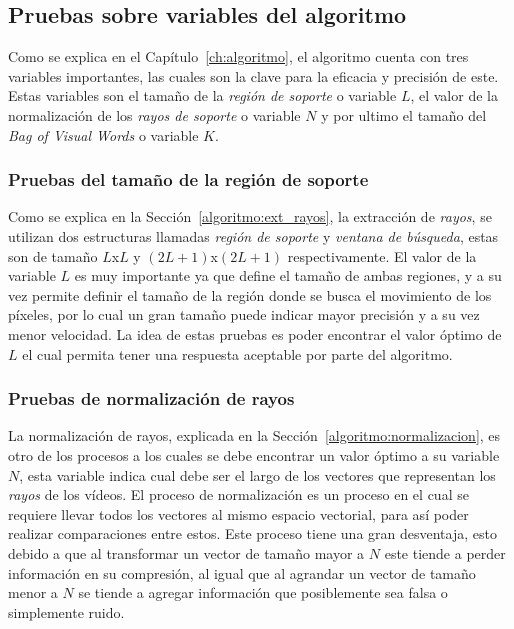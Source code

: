 \subsection{Pruebas sobre variables del algoritmo}
\label{exp:var}
Como se explica en el Capítulo~\ref{ch:algoritmo}, el algoritmo cuenta con tres variables importantes, las cuales son la clave para la eficacia y precisión de este. Estas variables son el tamaño de la \textit{región de soporte} o variable $L$, el valor de la normalización de los \textit{rayos de soporte} o variable $N$ y por ultimo el tamaño del \textit{Bag of Visual Words} o variable $K$.

\subsubsection{Pruebas del tamaño de la región de soporte}
Como se explica en la Sección~\ref{algoritmo:ext_rayos}, la extracción de \textit{rayos}, se utilizan dos estructuras llamadas \textit{región de soporte} y \textit{ventana de búsqueda}, estas son de tamaño $L$x$L$ y $(2L+1)$x$(2L+1)$ respectivamente. El valor de la variable $L$ es muy importante ya que define el tamaño de ambas regiones, y a su vez permite definir el tamaño de la región donde se busca el movimiento de los píxeles, por lo cual un gran tamaño puede indicar mayor precisión y a su vez menor velocidad. La idea de estas pruebas es poder encontrar el valor óptimo de $L$ el cual permita tener una respuesta aceptable por parte del algoritmo. 

\subsubsection{Pruebas de normalización de rayos}	

La normalización de rayos, explicada en la Sección~\ref{algoritmo:normalizacion}, es otro de los procesos a los cuales se debe encontrar un valor óptimo a su variable $N$, esta variable indica cual debe ser el largo de los vectores que representan los \textit{rayos} de los vídeos. El proceso de normalización es un proceso en el cual se requiere llevar todos los vectores al mismo espacio vectorial, para así poder realizar comparaciones entre estos. Este proceso tiene una gran desventaja, esto debido a que al transformar un vector de tamaño mayor a $N$ este tiende a perder información en su compresión, al igual que al agrandar un vector de tamaño menor a $N$ se tiende a agregar información que posiblemente sea falsa o simplemente ruido.

